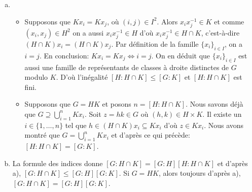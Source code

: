 \begin{enumerate}[a)]
\item
  \begin{itemize}
    \item Supposons que $Kx_i = Kx_j$, où $(i,j)\in I^2$. Alors $x_ix_j^{-1}\in
      K$ et comme $(x_i,x_j)\in H^2$ on a aussi $x_ix_j^{-1}\in H$ d'où
      $x_ix_j^{-1}\in H\cap K$, c'est-à-dire $(H\cap K)x_i = (H\cap K)x_j$. Par
      définition de la famille $\{x_i\}_{i\in I}$, on a $i = j$. En conclusion:
      $Kx_i = Kx_j\iff i = j$. On en déduit que $\{x_i\}_{i\in I}$ est aussi
      une famille de représentants de classes à droite distinctes de $G$ modulo
      $K$. D'où l'inégalité $[H\colon H\cap K]\leqslant [G\colon K]$ et
      $[H\colon H\cap K]$ est fini. 
      
    \item Supposons que $G = HK$ et posons $n = [H\colon H\cap K]$. Nous savons
      déjà que $G\supseteq\bigcup_{i=1}^{n} Kx_i$.  Soit $z = hk\in G$ où
      $(h,k)\in H\times K$. Il existe un $i\in\{1,\ldots,n\}$ tel que $h\in
      (H\cap K)x_i\subseteq Kx_i$ d'où $z\in Kx_i$. Nous avons montré que $G =
      \bigcup_{i=1}^n Kx_i$ et d'après ce qui précède: $[H\colon H\cap K] =
      [G\colon K]$.
  \end{itemize}

\item La formule des indices donne $[G\colon H\cap K] = [G\colon H][H\colon
  H\cap K]$ et d'après a), $[G\colon H\cap K]\leqslant [G\colon H][G\colon K]$.
  Si $G = HK$, alors toujours d'après a), $[G\colon H\cap K] = [G\colon
  H][G\colon K]$.

\end{enumerate}
